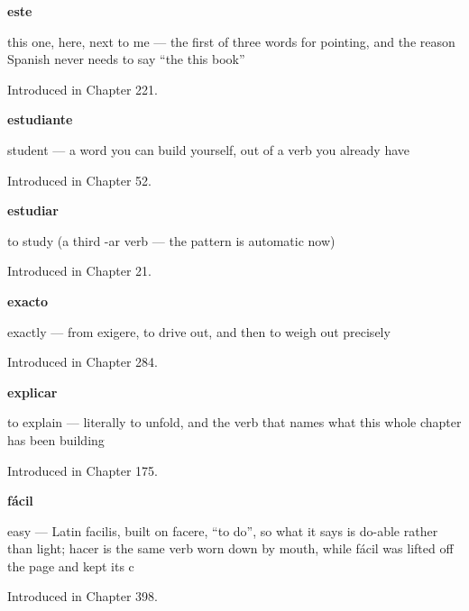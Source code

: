 \noindent\begin{minipage}[t]{\linewidth}
\raggedright
\textbf{este}\par
\small this one, here, next to me — the first of three words for pointing, and the reason Spanish never needs to say \textquotedblleft{}the this book\textquotedblright{}\par
\footnotesize Introduced in Chapter 221.
\end{minipage}\par\medskip

\noindent\begin{minipage}[t]{\linewidth}
\raggedright
\textbf{estudiante}\par
\small student — a word you can build yourself, out of a verb you already have\par
\footnotesize Introduced in Chapter 52.
\end{minipage}\par\medskip

\noindent\begin{minipage}[t]{\linewidth}
\raggedright
\textbf{estudiar}\par
\small to study (a third -ar verb — the pattern is automatic now)\par
\footnotesize Introduced in Chapter 21.
\end{minipage}\par\medskip

\noindent\begin{minipage}[t]{\linewidth}
\raggedright
\textbf{exacto}\par
\small exactly — from exigere, to drive out, and then to weigh out precisely\par
\footnotesize Introduced in Chapter 284.
\end{minipage}\par\medskip

\noindent\begin{minipage}[t]{\linewidth}
\raggedright
\textbf{explicar}\par
\small to explain — literally to unfold, and the verb that names what this whole chapter has been building\par
\footnotesize Introduced in Chapter 175.
\end{minipage}\par\medskip

\noindent\begin{minipage}[t]{\linewidth}
\raggedright
\textbf{fácil}\par
\small easy — Latin facilis, built on facere, \textquotedblleft{}to do\textquotedblright{}, so what it says is do-able rather than light; hacer is the same verb worn down by mouth, while fácil was lifted off the page and kept its c\par
\footnotesize Introduced in Chapter 398.
\end{minipage}\par\medskip

